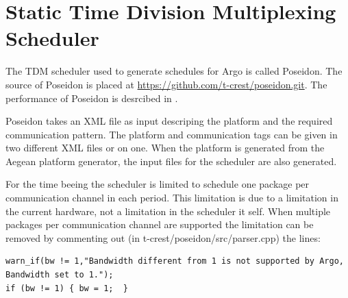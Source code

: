 \documentclass[a4paper,fontsize=10pt,twoside,DIV15,BCOR12mm,headinclude=true,footinclude=false,pagesize,bibtotoc]{scrbook}
\begin{document}
\section{Static Time Division Multiplexing Scheduler}
\label{sec:poseidon}
The TDM scheduler used to generate schedules for Argo is called Poseidon.
The source of Poseidon is placed at \url{https://github.com/t-crest/poseidon.git}.
The performance of Poseidon is desrcibed in \cite{tcrest:poseidon}.%

Poseidon takes an XML file as input descriping the platform and the required communication pattern.
The platform and communication tags can be given in two different XML files or on one.
When the platform is generated from the Aegean platform generator, the input files for the scheduler are also generated.

For the time beeing the scheduler is limited to schedule one package per communication channel in each period.
This limitation is due to a limitation in the current hardware, not a limitation in the scheduler it self.
When multiple packages per communication channel are supported the limitation can be removed by commenting out (in t-crest/poseidon/src/parser.cpp) the lines:

\begin{verbatim}
warn_if(bw != 1,"Bandwidth different from 1 is not supported by Argo, Bandwidth set to 1.");
if (bw != 1) { bw = 1;  }
\end{verbatim}








\end{document}
